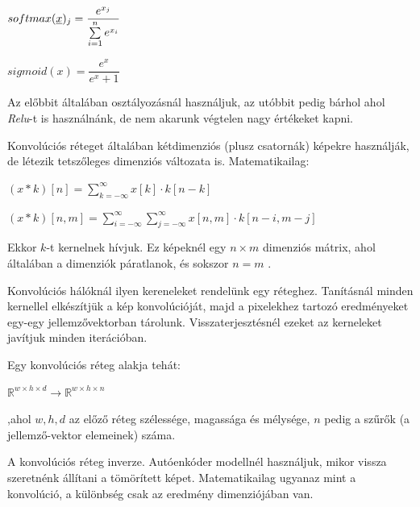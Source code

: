 $ softmax(\underline{x})_j = \dfrac{e^{x_j}}{\sum\limits_{{i}=1}^{n}e^{x_i}} $


$ sigmoid(x) = \dfrac{e^x}{e^x + 1} $

\noindent
Az előbbit általában osztályozásnál használjuk, az utóbbit pedig 
bárhol ahol \textit{Relu}-t is használnánk, de nem akarunk végtelen 
nagy értékeket kapni.





Konvolúciós réteget általában kétdimenziós (plusz csatornák) 
képekre használják, de létezik tetszőleges dimenziós változata is.  
Matematikailag:


$ (x*k)[n] =  \sum\limits_{k=-\infty}^{\infty} x[k] \cdot k[n-k] $

$ (x*k)[n, m] =  
\sum\limits_{i=-\infty}^{\infty} 
\sum\limits_{j=-\infty}^{\infty} 
x[n, m] \cdot k[n-i, m-j] $


Ekkor $ k $-t kernelnek hívjuk.
Ez képeknél egy $ n \times m $ dimenziós mátrix, 
ahol általában a dimenziók páratlanok, és sokszor $ n = m $ .


Konvolúciós hálóknál ilyen kereneleket rendelünk egy réteghez.
Tanításnál minden kernellel elkészítjük a kép konvolúcióját,
majd a pixelekhez tartozó eredményeket egy-egy jellemzővektorban tárolunk.
Visszaterjesztésnél ezeket az kerneleket javítjuk minden iterációban.

\noindent
Egy konvolúciós réteg alakja tehát:

$ \mathbb{R}^{w \times h \times d} \rightarrow \mathbb{R}^{w \times h \times n} $

\noindent
,ahol $ w, h,d $ az előző réteg szélessége, magassága és mélysége, 
$ n $ pedig a szűrők (a jellemző-vektor elemeinek) száma.









A konvolúciós réteg inverze.
Autóenkóder modellnél használjuk, mikor vissza szeretnénk állítani
a tömörített képet. Matematikailag ugyanaz mint a konvolúció,
a különbség csak az eredmény dimenziójában van.



